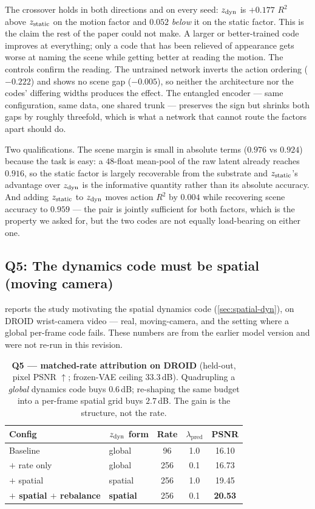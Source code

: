 The crossover holds in both directions and on every seed: $z_{\mathrm{dyn}}$ is $+0.177$ $R^2$ above
$z_{\mathrm{static}}$ on the motion factor and $0.052$ \emph{below} it on the static factor. This is the
claim the rest of the paper could not make. A larger or better-trained code improves at
everything; only a code that has been relieved of appearance gets worse at naming the
scene while getting better at reading the motion. The controls confirm the reading. The
untrained network inverts the action ordering ($-0.222$) and shows no scene gap
($-0.005$), so neither the architecture nor the codes' differing widths produces the
effect. The entangled encoder --- same configuration, same data, one shared trunk ---
preserves the sign but shrinks both gaps by roughly threefold, which is what a network
that cannot route the factors apart should do.

Two qualifications. The scene margin is small in absolute terms ($0.976$ vs $0.924$)
because the task is easy: a $48$-float mean-pool of the raw latent already reaches
$0.916$, so the static factor is largely recoverable from the substrate and $z_{\mathrm{static}}$'s
advantage over $z_{\mathrm{dyn}}$ is the informative quantity rather than its absolute accuracy. And
adding $z_{\mathrm{static}}$ to $z_{\mathrm{dyn}}$ moves action $R^2$ by $0.004$ while recovering scene accuracy to
$0.959$ --- the pair is jointly sufficient for both factors, which is the property we
asked for, but the two codes are not equally load-bearing on either one.

\subsection{Q5: The dynamics code must be spatial (moving camera)}
\label{sec:droid}
 reports the study motivating the spatial dynamics code
(\cref{sec:spatial-dyn}), on DROID wrist-camera video --- real, moving-camera, and the
setting where a global per-frame code fails. These numbers are from the earlier model
version \pmark{} and were not re-run in this revision.

\begin{table}[t]
\centering\small
\caption{\textbf{Q5 --- matched-rate attribution on DROID} \pmark{} (held-out, pixel
PSNR $\uparrow$; frozen-VAE ceiling $33.3$\,dB). Quadrupling a \emph{global} dynamics
code buys $0.6$\,dB; re-shaping the same budget into a per-frame spatial grid buys
$2.7$\,dB. The gain is the structure, not the rate.}
\label{tab:droid}
\begin{tabular}{llccc}
\toprule
Config & $z_{\mathrm{dyn}}$ form & Rate & $\lambda_{\mathrm{pred}}$ & PSNR \\
\midrule
Baseline & global & 96 & 1.0 & 16.10 \\
$+$ rate only & global & 256 & 0.1 & 16.73 \\
$+$ spatial & spatial & 256 & 1.0 & 19.45 \\
\textbf{$+$ spatial $+$ rebalance} & \textbf{spatial} & 256 & 0.1 & \textbf{20.53} \\
\bottomrule
\end{tabular}
\end{table}

